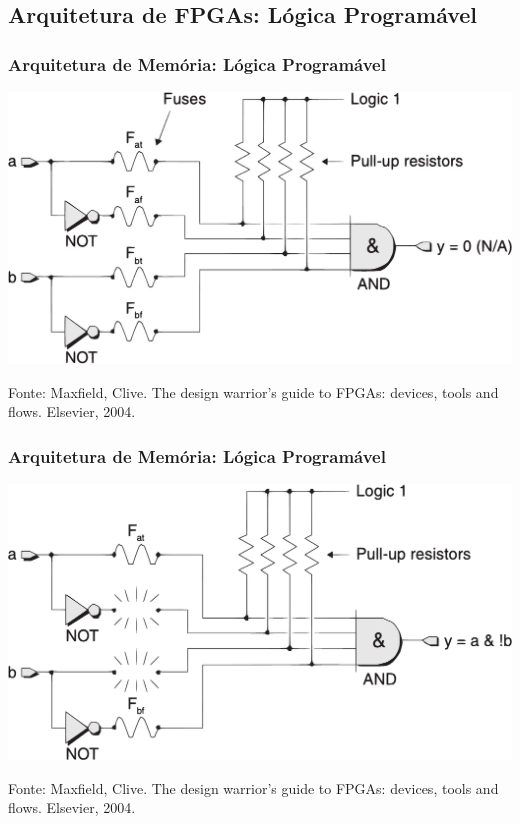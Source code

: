 \documentclass[10pt, compress, aspectratio=169, xcolor={table,usenames,dvipsnames}]{beamer}
\begin{document}
\subsection{Arquitetura de FPGAs: Lógica Programável}

\begin{frame}
    \frametitle{Arquitetura de Memória: Lógica Programável}
    \begin{center}
        \includegraphics[width=.65\textwidth]{fusible-link}
    \end{center}

    \vfill

    \begin{center}
        \scriptsize{Fonte: Maxfield, Clive. The design warrior's guide to FPGAs: devices, tools and flows. Elsevier, 2004.}
    \end{center}
\end{frame}

\begin{frame}
    \frametitle{Arquitetura de Memória: Lógica Programável}
    \begin{center}
        \includegraphics[width=.65\textwidth]{fusible-programmed}
    \end{center}

    \vfill

    \begin{center}
        \scriptsize{Fonte: Maxfield, Clive. The design warrior's guide to FPGAs: devices, tools and flows. Elsevier, 2004.}
    \end{center}
\end{frame}
\end{document}
